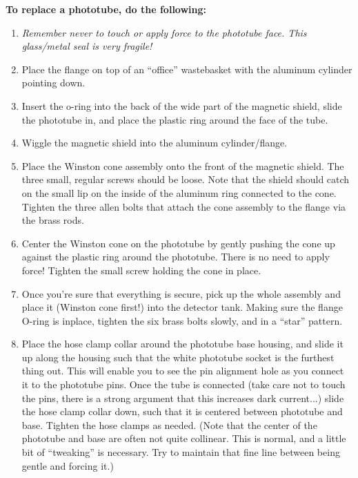 	{\bf To replace a phototube, do the following:}
\begin{enumerate}

\item  {\em Remember never to touch or apply force to the phototube face.  This
glass/metal seal is very fragile!}

\item  Place the flange on top of an ``office'' wastebasket with the aluminum
cylinder pointing down.

\item  Insert the o-ring into the back of the wide part of the magnetic
shield, slide the phototube in, and place the plastic ring around the
face of the tube.

\item  Wiggle the magnetic shield into the aluminum cylinder/flange.

\item  Place the Winston cone assembly onto the front of the magnetic
shield.  The three small, regular screws should be loose.  Note that
the shield should catch on the small lip on the inside of the aluminum
ring connected to the cone.  Tighten the three allen bolts that attach
the cone assembly to the flange via the brass rods.

\item Center the Winston cone on the phototube by gently pushing the cone
up against the plastic ring around the phototube.  There is no need to
apply force!  Tighten the small screw holding the cone in place.

\item Once you're sure that everything is secure, pick up the whole
assembly and place it (Winston cone first!) into the detector tank.
Making sure the flange O-ring is inplace, tighten the six brass bolts
slowly, and in a ``star'' pattern.

\item Place the hose clamp collar around the phototube base housing, and
slide it up along the housing such that the white phototube socket is
the furthest thing out.  This will enable you to see the pin alignment
hole as you connect it to the phototube pins.  Once the tube is
connected (take care not to touch the pins, there is a strong argument
that this increases dark current...) slide the hose clamp collar down,
such that it is centered between phototube and base.  Tighten the hose
clamps as needed.  (Note that the center of the phototube and base are
often not quite collinear.  This is normal, and a little bit of
``tweaking'' is necessary.  Try to maintain that fine line between being
gentle and forcing it.)
\end{enumerate}

